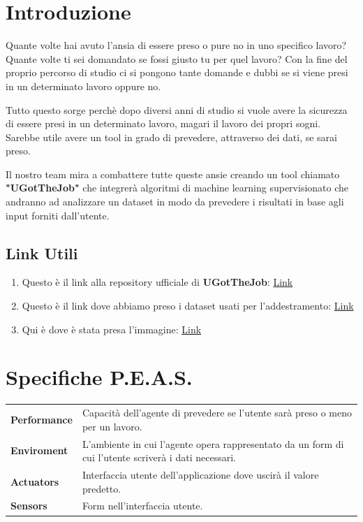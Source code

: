 \documentclass{article}
\newcommand{\mainname}{UGotTheJob}
\begin{document}
\newpage %

\tableofcontents

\newpage

\section{Introduzione}
Quante volte hai avuto l'ansia di essere preso o pure no in uno specifico lavoro?
Quante volte ti sei domandato se fossi giusto tu per quel lavoro? Con la fine del proprio percorso
di studio ci si pongono tante domande e dubbi se si viene presi in un determinato lavoro oppure no.
\par
Tutto questo sorge perchè dopo diversi anni di studio si vuole avere la sicurezza di essere presi
in un determinato lavoro, magari il lavoro dei propri sogni. Sarebbe utile avere un tool in grado di
prevedere, attraverso dei dati, se sarai preso.
\par
Il nostro team mira a combattere tutte queste ansie creando un tool chiamato \textbf{"\mainname"}
che integrerà algoritmi di machine learning supervisionato che andranno ad analizzare un dataset
in modo da prevedere i risultati in base agli input forniti dall'utente.

\subsection{Link Utili}
\begin{enumerate}
    \item Questo è il link alla repository ufficiale di \textbf{\mainname}: \href{https://github.com/ShackWove/GuessUJob}{Link}
    \item Questo è il link dove abbiamo preso i dataset usati per l'addestramento: \href{https://www.kaggle.com/datasets/ahsan81/job-placement-dataset}{Link}
    \item Qui è dove è stata presa l'immagine: \href{https://www.flaticon.com/free-icon/job-seeking_1503438}{Link}
\end{enumerate}

\section{Specifiche P.E.A.S.}

\begin{table}[ht]
    \centering
    \begin{tabular}{| l | m{8cm} |}
        \hline
        \textbf{Performance} & Capacità dell'agente di prevedere se l'utente sarà preso o meno per un lavoro.                       \\
        \textbf{Enviroment}  & L'ambiente in cui l'agente opera rappresentato da un form di cui l'utente scriverà i dati necessari. \\
        \textbf{Actuators}   & Interfaccia utente dell'applicazione dove uscirà il valore predetto.                                 \\
        \textbf{Sensors}     & Form nell'interfaccia utente.                                                                        \\
        \hline
    \end{tabular}
\end{table}
\end{document}
